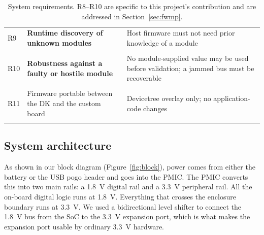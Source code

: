 \documentclass[12pt, a4paper]{article}
\begin{document}
\begin{table}[H]
\begin{tabular}{@{}p{1.4cm} p{5.6cm} p{7cm}@{}}
R9 & \textbf{Runtime discovery of unknown modules} & Host firmware must not need prior knowledge of a module \\\\
R10 & \textbf{Robustness against a faulty or hostile module} & No module-supplied value may be used before validation; a jammed bus must be recoverable \\\\
R11 & Firmware portable between the DK and the custom board & Devicetree overlay only; no application-code changes \\\\
\bottomrule
\end{tabular}
\caption{System requirements. R8--R10 are specific to this project's contribution and are addressed in Section~\ref{sec:fwmp}.}
\label{tab:requirements}
\end{table}

\newpage

\subsection{System architecture}

As shown in our block diagram (Figure~\ref{fig:block}), power comes from either the battery or the USB pogo header and goes into the PMIC. The PMIC converts this into two main rails: a \SI{1.8}{\volt} digital rail and a \SI{3.3}{\volt} peripheral rail. All the on-board digital logic runs at \SI{1.8}{\volt}. Everything that crosses the enclosure boundary runs at \SI{3.3}{\volt}. We used a bidirectional level shifter to connect the \SI{1.8}{\volt}  bus from the SoC to the \SI{3.3}{\volt} expansion port, which is what makes the expansion port usable by ordinary \SI{3.3}{\volt} hardware.
\end{document}
